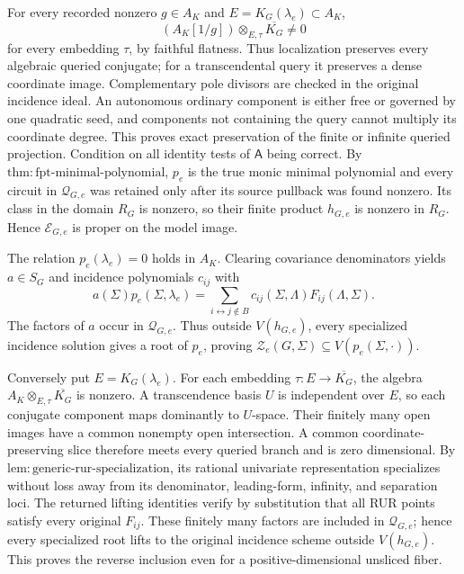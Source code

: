 For every recorded nonzero \(g\in A_K\) and \(E=K_G(\lambda_e)\subset A_K\),
\[
(A_K[1/g])\otimes_{E,\tau}\overline{K_G}\ne0
\]
for every embedding \(\tau\), by faithful flatness. Thus localization preserves every algebraic queried conjugate; for a transcendental query it preserves a dense coordinate image. Complementary pole divisors are checked in the original incidence ideal. An autonomous ordinary component is either free or governed by one quadratic seed, and components not containing the query cannot multiply its coordinate degree. This proves exact preservation of the finite or infinite queried projection.
Condition on all identity tests of \(\mathsf A\) being correct. By \(\mathrm{thm:fpt\mbox{-}minimal\mbox{-}polynomial}\), \(p_e\) is the true monic minimal polynomial and every circuit in \(\mathcal Q_{G,e}\) was retained only after its source pullback was found nonzero. Its class in the domain \(R_G\) is nonzero, so their finite product \(h_{G,e}\) is nonzero in \(R_G\). Hence \(\mathcal E_{G,e}\) is proper on the model image.

The relation \(p_e(\lambda_e)=0\) holds in \(A_K\). Clearing covariance denominators yields \(a\in S_G\) and incidence polynomials \(c_{ij}\) with
\[
a(\Sigma)p_e(\Sigma,\lambda_e)
=\sum_{i\leftrightarrow j\notin B}c_{ij}(\Sigma,\Lambda)F_{ij}(\Lambda,\Sigma).
\]
The factors of \(a\) occur in \(\mathcal Q_{G,e}\). Thus outside \(V(h_{G,e})\), every specialized incidence solution gives a root of \(p_e\), proving \(\mathcal Z_e(G,\Sigma)\subseteq V(p_e(\Sigma,\cdot))\).

Conversely put \(E=K_G(\lambda_e)\). For each embedding \(\tau:E\to\overline{K_G}\), the algebra \(A_K\otimes_{E,\tau}\overline{K_G}\) is nonzero. A transcendence basis \(U\) is independent over \(E\), so each conjugate component maps dominantly to \(U\)-space. Their finitely many open images have a common nonempty open intersection. A common coordinate-preserving slice therefore meets every queried branch and is zero dimensional. By \(\mathrm{lem:generic\mbox{-}rur\mbox{-}specialization}\), its rational univariate representation specializes without loss away from its denominator, leading-form, infinity, and separation loci. The returned lifting identities verify by substitution that all RUR points satisfy every original \(F_{ij}\). These finitely many factors are included in \(\mathcal Q_{G,e}\); hence every specialized root lifts to the original incidence scheme outside \(V(h_{G,e})\). This proves the reverse inclusion even for a positive-dimensional unsliced fiber.

